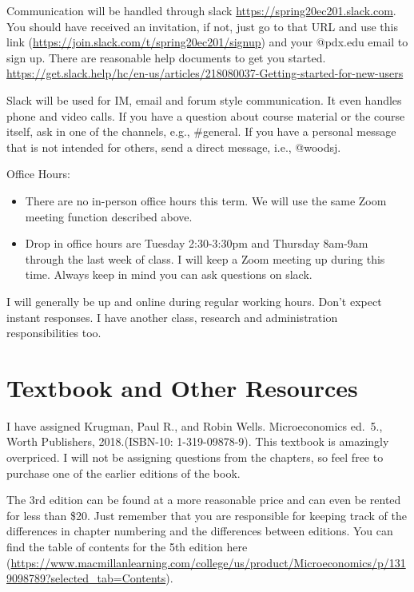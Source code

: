 \documentclass[
]{article}
\providecommand{\tightlist}{%
  \setlength{\itemsep}{0pt}\setlength{\parskip}{0pt}}
\begin{document}
Communication will be handled through slack
\url{https://spring20ec201.slack.com}. You should have received an
invitation, if not, just go to that URL and use this link
(\url{https://join.slack.com/t/spring20ec201/signup}) and your @pdx.edu
email to sign up. There are reasonable help documents to get you
started.
\url{https://get.slack.help/hc/en-us/articles/218080037-Getting-started-for-new-users}

Slack will be used for IM, email and forum style communication. It even
handles phone and video calls. If you have a question about course
material or the course itself, ask in one of the channels, e.g.,
\#general. If you have a personal message that is not intended for
others, send a direct message, i.e., @woodsj.

Office Hours:

\begin{itemize}
\tightlist
\item
  There are no in-person office hours this term. We will use the same
  Zoom meeting function described above.
\item
  Drop in office hours are Tuesday 2:30-3:30pm and Thursday 8am-9am
  through the last week of class. I will keep a Zoom meeting up during
  this time. Always keep in mind you can ask questions on slack.
\end{itemize}

I will generally be up and online during regular working hours. Don't
expect instant responses. I have another class, research and
administration responsibilities too.

\hypertarget{textbook-and-other-resources}{%
\section{Textbook and Other
Resources}\label{textbook-and-other-resources}}

I have assigned Krugman, Paul R., and Robin Wells. Microeconomics
ed.~5., Worth Publishers, 2018.(ISBN-10: 1-319-09878-9). This textbook
is amazingly overpriced. I will not be assigning questions from the
chapters, so feel free to purchase one of the earlier editions of the
book.

The 3rd edition can be found at a more reasonable price and can even be
rented for less than \$20. Just remember that you are responsible for
keeping track of the differences in chapter numbering and the
differences between editions. You can find the table of contents for the
5th edition here
(\url{https://www.macmillanlearning.com/college/us/product/Microeconomics/p/1319098789?selected_tab=Contents}).
\end{document}
